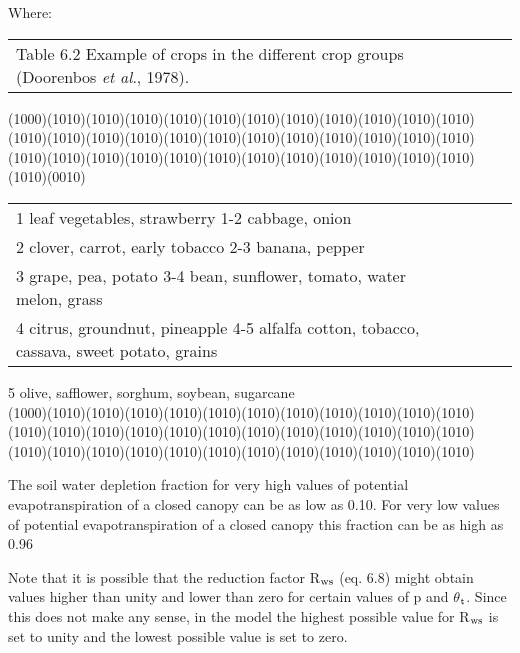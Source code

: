 Where:\\
\begin{tabularx}{\textwidth}{llXr}



Table 6.2  Example of crops in the different crop groups (Doorenbos {\it et al\/}., 1978).
\end{tabularx}
\GrBox(1000)\GrBox(1010)\GrBox(1010)\GrBox(1010)\GrBox(1010)\GrBox(1010)\GrBox(1010)\GrBox(1010)\GrBox(1010)\GrBox(1010)\GrBox(1010)\GrBox(1010)\GrBox(1010)\GrBox(1010)\GrBox(1010)\GrBox(1010)\GrBox(1010)\GrBox(1010)\GrBox(1010)\GrBox(1010)\GrBox(1010)\GrBox(1010)\GrBox(1010)\GrBox(1010)\GrBox(1010)\GrBox(1010)\GrBox(1010)\GrBox(1010)\GrBox(1010)\GrBox(1010)\GrBox(1010)\GrBox(1010)\GrBox(1010)\GrBox(1010)\GrBox(1010)\GrBox(1010)\GrBox(1010)\GrBox(0010)\nwln
\begin{tabularx}{\textwidth}{llXr}



1  leaf vegetables, strawberry     1-2  cabbage, onion\\
2  clover, carrot, early tobacco     2-3  banana, pepper\\
3  grape, pea, potato     3-4  bean, sunflower, tomato, water melon, grass\\
4  citrus, groundnut, pineapple     4-5  alfalfa cotton, tobacco, cassava, sweet potato, grains
\end{tabularx}
5  olive, safflower, sorghum, soybean, sugarcane\\
\GrBox(1000)\GrBox(1010)\GrBox(1010)\GrBox(1010)\GrBox(1010)\GrBox(1010)\GrBox(1010)\GrBox(1010)\GrBox(1010)\GrBox(1010)\GrBox(1010)\GrBox(1010)\GrBox(1010)\GrBox(1010)\GrBox(1010)\GrBox(1010)\GrBox(1010)\GrBox(1010)\GrBox(1010)\GrBox(1010)\GrBox(1010)\GrBox(1010)\GrBox(1010)\GrBox(1010)\GrBox(1010)\GrBox(1010)\GrBox(1010)\GrBox(1010)\GrBox(1010)\GrBox(1010)\GrBox(1010)\GrBox(1010)\GrBox(1010)\GrBox(1010)\GrBox(1010)\GrBox(1010)\-

The soil water depletion fraction for very high values of potential evapotranspir\-ation of a
closed canopy can be as low as 0.10. For very low values of potential evapotranspiration
of a closed canopy this fraction can be as high as 0.96 


Note that it is possible that the reduction factor R$_{{\rm ws}}$ (eq. 6.8) might obtain values higher
than unity and lower than zero for certain values of p and $\theta$$_{{\rm t}}$. Since this does not make
any sense, in the model the highest possible value for R$_{{\rm ws}}$ is set to unity and the lowest
possible value is set to zero.

